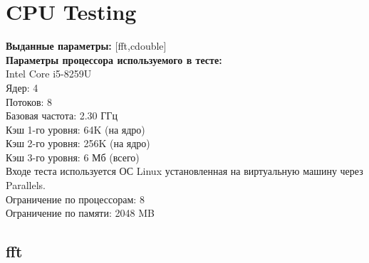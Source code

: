 \documentclass[12pt,onecolumn]{article}
\begin{document}
\section{CPU Testing}
\textbf{Выданные параметры:} [fft,cdouble]\\
\textbf{Параметры процессора используемого в тесте:}\\
{\large Intel Core i5-8259U}\\
Ядер: 4\\
Потоков: 8\\
Базовая частота: 	2.30 ГГц\\
Кэш 1-го уровня: 	64K (на ядро)\\
Кэш 2-го уровня: 	256K (на ядро)\\
Кэш 3-го уровня: 	6 Мб (всего)\\
Входе теста используется ОС Linux установленная на виртуальную машину через Parallels.\\
Ограничение по процессорам: 8\\
Ограничение по памяти: 2048 MB\\
\subsection{fft}
\end{document}
